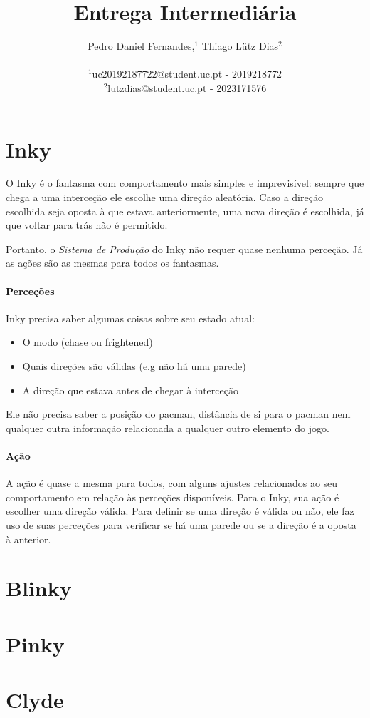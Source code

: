 \documentclass[12pt]{article}
\title{Entrega Intermediária}
\author{
    Pedro Daniel Fernandes,$^{1}$ Thiago Lütz Dias$^{2}$\\
\\
\normalsize{$^{1}$uc20192187722@student.uc.pt - 2019218772}\\
\normalsize{$^{2}$lutzdias@student.uc.pt - 2023171576}\\
}
\date{}
\begin{document}
 

\maketitle 

\section*{Inky}

O Inky é o fantasma com comportamento mais simples e imprevisível: sempre que
chega a uma interceção ele escolhe uma direção aleatória. Caso a direção
escolhida seja oposta à que estava anteriormente, uma nova direção é escolhida,
já que voltar para trás não é permitido.

Portanto, o \textit{Sistema de Produção} do Inky não requer quase nenhuma
perceção. Já as ações são as mesmas para todos os fantasmas.

\paragraph*{Perceções}
Inky precisa saber algumas coisas sobre seu estado atual:
\begin{itemize}
    \item O modo (chase ou frightened)
    \item Quais direções são válidas (e.g não há uma parede)
    \item A direção que estava antes de chegar à interceção
\end{itemize}
Ele não precisa saber a posição do pacman, distância de si para o pacman nem
qualquer outra informação relacionada a qualquer outro elemento do jogo.

\paragraph*{Ação}
A ação é quase a mesma para todos, com alguns ajustes relacionados ao seu
comportamento em relação às perceções disponíveis. Para o Inky, sua ação é
escolher uma direção válida. Para definir se uma direção é válida ou não, ele
faz uso de suas perceções para verificar se há uma parede ou se a direção é a
oposta à anterior.

\section*{Blinky}

\section*{Pinky}

\section*{Clyde}
\end{document}
